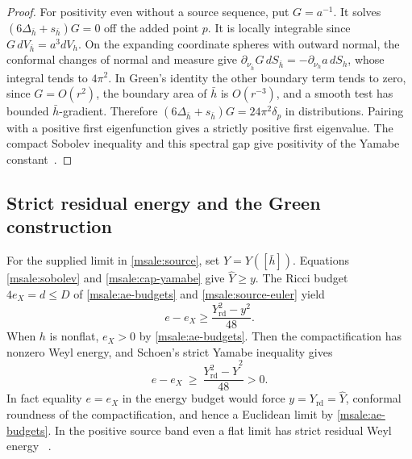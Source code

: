 \documentclass[11pt]{article}
\numberwithin{equation}{section}
\theoremstyle{definition}
\theoremstyle{remark}
\newcommand{\rd}{\mathrm{rd}}
\begin{document}
\begin{proof}
For positivity even without a source sequence, put \(G=a^{-1}\).
It solves \((6\Delta_{\bar h}+s_{\bar h})G=0\) off the
added point \(p\). It is locally integrable since
\(G\,dV_{\bar h}=a^3 dV_h\). On the expanding coordinate spheres
with outward normal, the conformal changes of normal and measure
give \(\partial_{\nu_{\bar h}}G\,dS_{\bar h}
=-\partial_{\nu_h}a\,dS_h\), whose integral tends to \(4\pi^2\).
In Green's identity the other boundary term tends to zero, since
\(G=O(r^2)\), the boundary area of \(\bar h\) is \(O(r^{-3})\),
and a smooth test has bounded \(\bar h\)-gradient. Therefore
\((6\Delta_{\bar h}+s_{\bar h})G=24\pi^2\delta_p\) in
distributions. Pairing with a positive first eigenfunction gives
a strictly positive first eigenvalue. The compact Sobolev
inequality and this spectral gap give positivity of the
Yamabe constant~\cite[\S\S2, 6]{LeeParker1987Yamabe}.
\end{proof}

\subsection{Strict residual energy and the Green construction}

For the supplied limit in \eqref{msale:source}, set
\(\widehat Y=Y([\bar h])\). Equations \eqref{msale:sobolev} and
\eqref{msale:cap-yamabe} give \(\widehat Y\ge y\).
The Ricci budget \(4e_X=d\le D\) of \eqref{msale:ae-budgets}
and \eqref{msale:source-euler} yield
\begin{equation}\label{msale:residual}
 e-e_X\ge \frac{Y_{\rd}^2-y^2}{48}.
\end{equation}
When \(h\) is nonflat, \(e_X>0\) by \eqref{msale:ae-budgets}.
Then the compactification has nonzero Weyl energy, and Schoen's
strict Yamabe inequality gives
\begin{equation}\label{msale:strict-residual}
 e-e_X\ \ge\ \frac{Y_{\rd}^2-\widehat Y^2}{48}>0 .
\end{equation}
In fact equality \(e=e_X\) in the energy budget would force
\(y=Y_{\rd}=\widehat Y\), conformal roundness of the
compactification, and hence a Euclidean limit by
\eqref{msale:ae-budgets}. In the positive source band even a
flat limit has strict residual Weyl energy
~\cite[Theorem 2]{Schoen1984Yamabe}.
\end{document}
